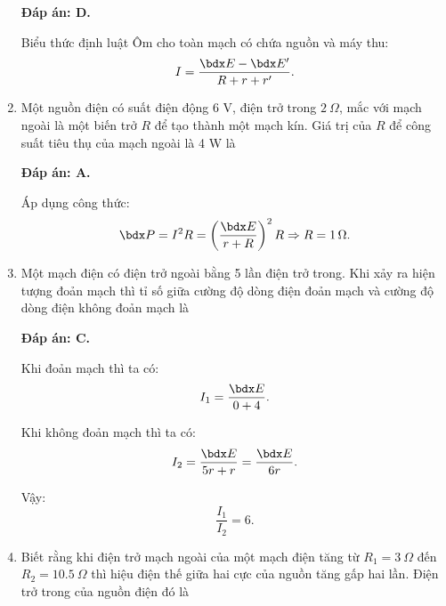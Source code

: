 \begin{enumerate}[label=\bfseries Câu \arabic*:]
{	}
	\loigiai
	{	\textbf{Đáp án: D.}
		
		Biểu thức định luật Ôm cho toàn mạch có chứa nguồn và máy thu:
		$$I=\dfrac{\calE - \calE'}{R+r+r'}.$$
	}
	\item {}
	
	\cauhoi
	{Một nguồn điện có suất điện động 6 V, điện trở trong $\SI{2}{\Omega}$, mắc với mạch ngoài là một biến trở $R$ để tạo thành một mạch kín. Giá trị của $R$ để công suất tiêu thụ của mạch ngoài là 4 W là
		
	}
	\loigiai
	{	\textbf{Đáp án: A.}
		
		Áp dụng công thức:
		$$\calP = I^2 R = \left(\dfrac{\calE}{r+R}\right)^2 R \Rightarrow R = \SI{1}{\Omega}.$$
	}
	\item {}
	
	\cauhoi
	{Một mạch điện có điện trở ngoài bằng 5 lần điện trở trong. Khi xảy ra hiện tượng đoản mạch thì tỉ số giữa cường độ dòng điện đoản mạch và cường độ dòng điện không đoản mạch là
		
	}
	\loigiai
	{	\textbf{Đáp án: C.}
		
		Khi đoản mạch thì ta có:
		$$I_1 = \dfrac{\calE}{0+4}.$$
		
		Khi không đoản mạch thì ta có:
		$$I_2 = \dfrac{\calE}{5r + r} = \dfrac{\calE}{6r}.$$
		
		Vậy:
		$$\dfrac{I_1}{I_2} = 6.$$
	}
	\item {}
	
	\cauhoi
	{Biết rằng khi điện trở mạch ngoài của một mạch điện tăng từ $R_1=\SI{3}{\Omega}$ đến $R_2=\SI{10.5}{\Omega}$ thì hiệu điện thế giữa hai cực của nguồn tăng gấp hai lần. Điện trở trong của nguồn điện đó là
		
}
\end{enumerate}

